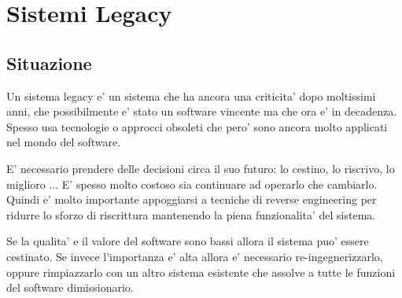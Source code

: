 \chapter{Sistemi Legacy}

\section{Situazione}

Un sistema legacy e' un sistema che ha ancora una criticita' dopo moltissimi anni, che possibilmente e' stato un software vincente ma che ora e' in decadenza.
Spesso usa tecnologie o approcci obsoleti che pero' sono ancora molto applicati nel mondo del software.

E' necessario prendere delle decisioni circa il suo futuro: lo cestino, lo riscrivo, lo miglioro ... 
E' spesso molto costoso sia continuare ad operarlo che cambiarlo.
Quindi e' molto importante appoggiarsi a tecniche di reverse engineering per ridurre lo sforzo di riscrittura mantenendo la piena funzionalita' del sistema.

Se la qualita' e il valore del software sono bassi allora il sistema puo' essere cestinato. Se invece l'importanza e' alta allora e' necessario re-ingegnerizzarlo, oppure rimpiazzarlo con un altro sistema esistente che assolve a tutte le funzioni del software dimissionario.


